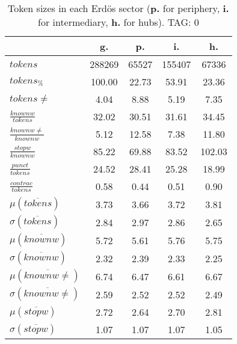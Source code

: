 \begin{table}[h!]
\begin{center}
\begin{tabular}{| l || c | c | c | c |}\hline
 & {\bf g.} & {\bf p.} & {\bf i.} & {\bf h.} \\\hline\hline
$tokens$ & 288269  & 65527  & 155407  & 67336 \\
$tokens_{\%}$ & 100.00  & 22.73  & 53.91  & 23.36 \\
$tokens \neq$ & 4.04  & 8.88  & 5.19  & 7.35 \\\hline
$\frac{knownw}{tokens}$ & 32.02  & 30.51  & 31.61  & 34.45 \\
$\frac{knownw \neq}{knownw}$ & 5.12  & 12.58  & 7.38  & 11.80 \\\hline
$\frac{stopw}{knownw}$ & 85.22  & 69.88  & 83.52  & 102.03 \\
$\frac{punct}{tokens}$ & 24.52  & 28.41  & 25.28  & 18.99 \\
$\frac{contrac}{tokens}$ & 0.58  & 0.44  & 0.51  & 0.90 \\\hline\hline
$\mu(\overline{tokens})$ & 3.73  & 3.66  & 3.72  & 3.81 \\
$\sigma(\overline{tokens})$ & 2.84  & 2.97  & 2.86  & 2.65 \\\hline
$\mu(\overline{knownw})$ & 5.72  & 5.61  & 5.76  & 5.75 \\
$\sigma(\overline{knownw})$ & 2.32  & 2.39  & 2.33  & 2.25 \\\hline
$\mu(\overline{knownw \neq})$ & 6.74  & 6.47  & 6.61  & 6.67 \\
$\sigma(\overline{knownw \neq})$ & 2.59  & 2.52  & 2.52  & 2.49 \\\hline
$\mu(\overline{stopw})$ & 2.72  & 2.64  & 2.70  & 2.81 \\
$\sigma(\overline{stopw})$ & 1.07  & 1.07  & 1.07  & 1.05 \\\hline
\end{tabular}
\caption{Token sizes in each Erd\"os sector ({{\bf p.}} for periphery, {{\bf i.}} for intermediary, {{\bf h.}} for hubs). TAG: 0}
\end{center}
\end{table}